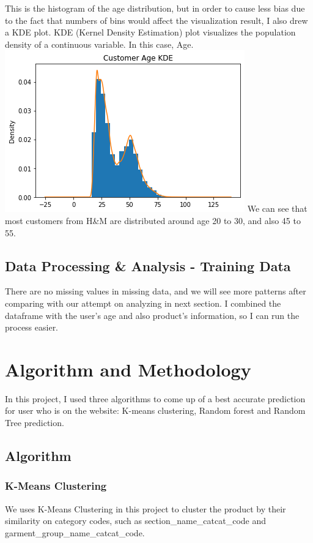\documentclass{article}
\begin{document}
This is the histogram of the age distribution, but in order to cause less bias due to the fact that numbers of bins would affect the visualization result, I also drew a KDE plot. KDE (Kernel Density Estimation) plot visualizes the population density of a continuous variable. In this case, Age.\\
\includegraphics[width=\textwidth]{kdecust}
We can see that most customers from H&M are distributed around age 20 to 30, and also 45 to 55. 

\subsection{Data Processing \& Analysis - Training Data}
There are no missing values in missing data, and we will see more patterns after comparing with our attempt on analyzing in next section. I combined the dataframe with the user's age and also product's information, so I can run the process easier.

\section{Algorithm and Methodology}
In this project, I used three algorithms to come up of a best accurate prediction for user who is on the website: K-means clustering, Random forest and Random Tree prediction.
\subsection{Algorithm}
\subsubsection{K-Means Clustering}
We uses K-Means Clustering in this project to cluster the product by their similarity on category codes, such as section\_name\_catcat\_code and garment\_group\_name\_catcat\_code.\\
\end{document}
